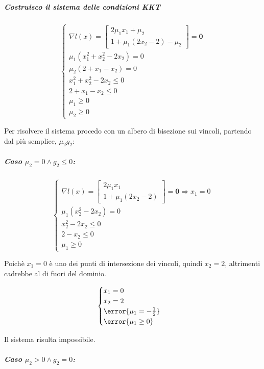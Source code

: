 \documentclass[\main/main.tex]{subfiles}
\begin{document}
\subparagraph*{Costruisco il sistema delle condizioni KKT}

\[
  \begin{cases}
    \nabla l(x) = \begin{bmatrix}
      2\mu_1x_1 + \mu_2 \\
      1 + \mu_1 (2x_2 - 2) - \mu_2
    \end{bmatrix}
    = \bm{0}                       \\
    \mu_1(x_1^2 + x^2_2 -2x_2) = 0 \\
    \mu_2(2 + x_1 - x_2) = 0       \\
    x_1^2 + x^2_2 -2x_2 \leq 0     \\
    2 + x_1 - x_2 \leq 0           \\
    \mu_1 \geq 0                   \\
    \mu_2 \geq 0
  \end{cases}
\]

Per risolvere il sistema procedo con un albero di bisezione sui vincoli, partendo dal più semplice, $\mu_2g_2$:

\subparagraph*{Caso $\mu_2 = 0 \land g_2 \leq 0$:}

\[
  \begin{cases}
    \nabla l(x) = \begin{bmatrix}
      2\mu_1x_1 \\
      1 + \mu_1 (2x_2 - 2)
    \end{bmatrix}
    = \bm{0} \Rightarrow x_1 = 0 \\
    \mu_1(x^2_2 -2x_2) = 0       \\
    x^2_2 -2x_2 \leq 0           \\
    2 - x_2 \leq 0               \\
    \mu_1 \geq 0
  \end{cases}
\]

Poichè $x_1 = 0$ è uno dei punti di intersezione dei vincoli, quindi $x_2 = 2$, altrimenti cadrebbe al di fuori del dominio.

\[
  \begin{cases}
    x_1 = 0                      \\
    x_2 = 2                      \\
    \error{\mu_1 = -\frac{1}{2}} \\
    \error{\mu_1 \geq 0}
  \end{cases}
\]

Il sistema risulta impossibile.

\subparagraph*{Caso $\mu_2 > 0 \land g_2 = 0$:}
\end{document}
